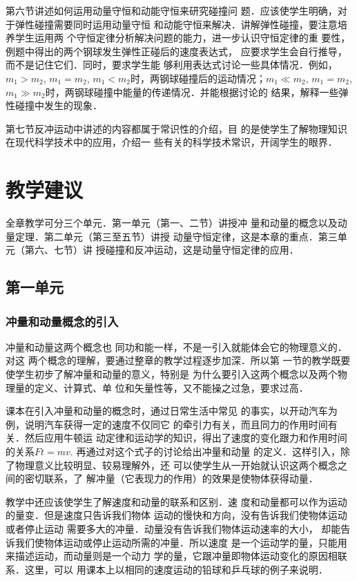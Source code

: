 第六节讲述如何运用动量守恒和动能守恒来研究碰撞问
题．应该使学生明确，对于弹性碰撞需要同时运用动量守恒
和动能守恒来解决．讲解弹性碰撞，要注意培养学生运用两
个守恒定律分析解决问题的能力，进一步认识守恒定律的重
要性，例题中得出的两个钢球发生弹性正碰后的速度表达式，
应要求学生会自行推导，而不是记住它们．同时，要求学生能
够利用表达式讨论一些具体情况．例如，$m_1>m_2$, $m_1=m_2$,
$m_1<m_2$时，两钢球碰撞后的运动情况；$m_1\ll m_2$, $m_1=m_2$, 
$m_1\gg m_2$时，两钢球碰撞中能量的传递情况．并能根据讨论的
结果，解释一些弹性碰撞中发生的现象．

第七节反冲运动中讲述的内容都属于常识性的介绍，目
的是使学生了解物理知识在现代科学技术中的应用，介绍一
些有关的科学技术常识，开阔学生的眼界．

\section{教学建议}
全章教学可分三个单元．第一单元（第一、二节）讲授冲
量和动量的概念以及动量定理．第二单元（第三至五节）讲授
动量守恒定律，这是本章的重点．第三单元（第六、七节）讲
授碰撞和反冲运动，这是动量守恒定律的应用．

\subsection{第一单元}
\subsubsection{冲量和动量概念的引入}

冲量和动量这两个概念也
同功和能一样，不是一引入就能体会它的物理意义的．对这
两个概念的理解，要通过整章的教学过程逐步加深．所以第
一节的教学既要使学生初步了解冲量和动量的意义，特别是
为什么要引入这两个概念以及两个物理量的定义、计算式、单
位和矢量性等，又不能操之过急，要求过高．

课本在引入冲量和动量的概念时，通过日常生活中常见
的事实，以开动汽车为例，说明汽车获得一定的速度不仅同它
的牵引力有关，而且同力的作用时间有关．然后应用牛顿运
动定律和运动学的知识，得出了速度的变化跟力和作用时间
的关系$Ft=mv$. 再通过对这个式子的讨论给出冲量和动量
的定义．这样引入，除了物理意义比较明显、较易理解外，还
可以使学生从一开始就认识这两个概念之间的密切联系，了
解冲量（它表现力的作用）的效果是使物体获得动量．

教学中还应该使学生了解速度和动量的联系和区别．速
度和动量都可以作为运动的量变．但是速度只告诉我们物体
运动的慢快和方向，没有告诉我们使物体运动或者停止运动
需要多大的冲量．动量没有告诉我们物体运动速率的大小，
却能告诉我们使物体运动或停止运动所需的冲量．所以速度
是一个运动学的量，只能用来描述运动，而动量则是一个动力
学的量，它跟冲量即物体运动变化的原因相联系．这里，可以
用课本上以相同的速度运动的铅球和乒乓球的例子来说明．

